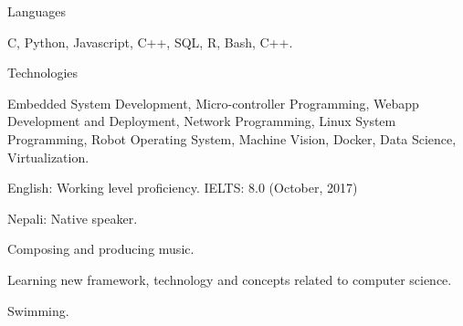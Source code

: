 

\begin{cventries}

  \cventry
    {Languages} %
    { }
    { } %
    { } %
    {
      \begin{cvitems} %
        \item {C, Python, Javascript, C++, SQL, R, Bash, C++.}
      \end{cvitems}
    }

  \cventry
    { Technologies } %
    {} %
    {} %
    {} %
    {
      \begin{cvitems} %
        \item { Embedded System Development, Micro-controller Programming, Webapp Development and Deployment, Network Programming, Linux System Programming, Robot Operating System, Machine Vision, Docker, Data Science, Virtualization.}
      \end{cvitems}
    }
\end{cventries}

\begin{cventries}
\cventry
{ } %
{} %
{} %
{} %
{
	\begin{cvitems} %
		\item { English: Working level proficiency. IELTS: 8.0 (October, 2017)}
		\item { Nepali: Native speaker.}
	\end{cvitems}
}

\end{cventries}

\begin{cventries}
	\cventry
	{ } %
	{} %
	{} %
	{} %
	{
		\begin{cvitems} %
			\item { Composing and producing music.}
			\item { Learning new framework, technology and concepts related to computer science. }
			\item { Swimming.}
		\end{cvitems}
	}
	
\end{cventries}